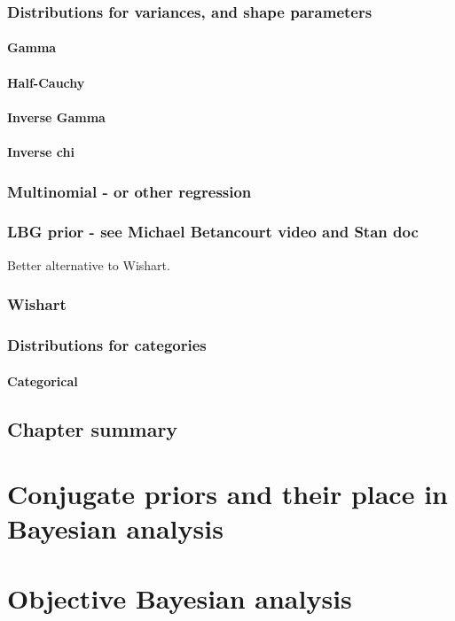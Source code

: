 \documentclass[11pt,fullpage]{book}
\begin{document}
\subsection{Distributions for variances, and shape parameters}
\subsubsection{Gamma}
\subsubsection{Half-Cauchy}
\subsubsection{Inverse Gamma}
\subsubsection{Inverse chi}
\subsection{Multinomial - or other regression}
\subsection{LBG prior - see Michael Betancourt video and Stan doc}
Better alternative to Wishart.
\subsection{Wishart}

\subsection{Distributions for categories}
\subsubsection{Categorical}
\section{Chapter summary}


\chapter{Conjugate priors and their place in Bayesian analysis}\label{chap:conjugate}

\chapter{Objective Bayesian analysis}\label{chap:ObjectiveBayes}
\end{document}

